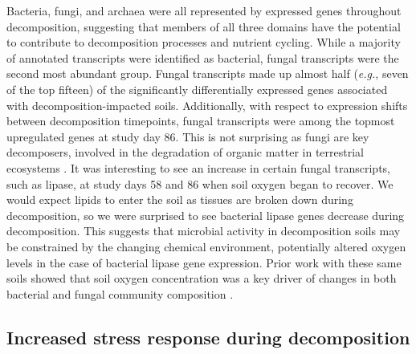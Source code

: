 \documentclass[
  sn-nature,
  lineno, referee]{sn-jnl}
\begin{document}
Bacteria, fungi, and archaea were all represented by expressed genes
throughout decomposition, suggesting that members of all three domains
have the potential to contribute to decomposition processes and nutrient
cycling. While a majority of annotated transcripts were identified as
bacterial, fungal transcripts were the second most abundant group.
Fungal transcripts made up almost half (\emph{e.g.}, seven of the top
fifteen) of the significantly differentially expressed genes associated
with decomposition-impacted soils. Additionally, with respect to
expression shifts between decomposition timepoints, fungal transcripts
were among the topmost upregulated genes at study day 86. This is not
surprising as fungi are key decomposers, involved in the degradation of
organic matter in terrestrial ecosystems
\citep{van_der_wal_thready_2013}. It was interesting to see an increase
in certain fungal transcripts, such as lipase, at study days 58 and 86
when soil oxygen began to recover. We would expect lipids to enter the
soil as tissues are broken down during decomposition, so we were
surprised to see bacterial lipase genes decrease during decomposition.
This suggests that microbial activity in decomposition soils may be
constrained by the changing chemical environment, potentially altered
oxygen levels in the case of bacterial lipase gene expression. Prior
work with these same soils showed that soil oxygen concentration was a
key driver of changes in both bacterial and fungal community composition
\citep{taylor_transient_2024}.

\subsection{Increased stress response during
decomposition}\label{increased-stress-response-during-decomposition}
\end{document}
